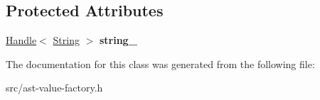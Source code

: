 \subsection*{Protected Attributes}
\begin{DoxyCompactItemize}
\item 
\hypertarget{classv8_1_1internal_1_1_ast_string_a031e411435d4c2749b7391eb9b3e18ae}{}\hyperlink{classv8_1_1internal_1_1_handle}{Handle}$<$ \hyperlink{classv8_1_1internal_1_1_string}{String} $>$ {\bfseries string\+\_\+}\label{classv8_1_1internal_1_1_ast_string_a031e411435d4c2749b7391eb9b3e18ae}

\end{DoxyCompactItemize}


The documentation for this class was generated from the following file\+:\begin{DoxyCompactItemize}
\item 
src/ast-\/value-\/factory.\+h\end{DoxyCompactItemize}
